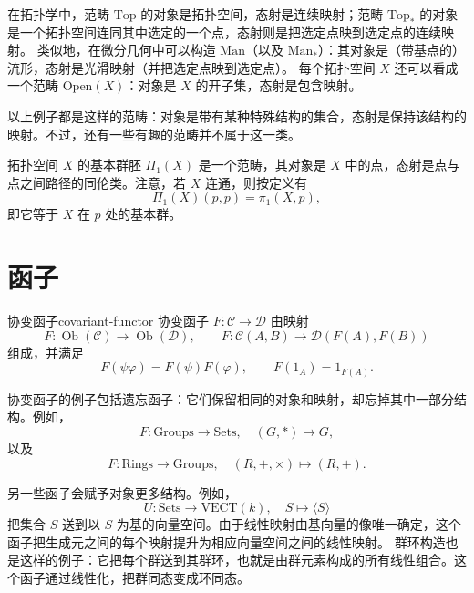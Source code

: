 \begin{example}[来自几何的例子]\label{ex:geometric-categories}
在拓扑学中，范畴 $\mathrm{Top}$ 的对象是拓扑空间，态射是连续映射；范畴 $\mathrm{Top}_*$ 的对象是一个拓扑空间连同其中选定的一个点，态射则是把选定点映到选定点的连续映射。
类似地，在微分几何中可以构造 $\mathrm{Man}$（以及 $\mathrm{Man}_*$）：其对象是（带基点的）流形，态射是光滑映射（并把选定点映到选定点）。
每个拓扑空间 $X$ 还可以看成一个范畴 $\mathrm{Open}(X)$：对象是 $X$ 的开子集，态射是包含映射。
\end{example}

以上例子都是这样的范畴：对象是带有某种特殊结构的集合，态射是保持该结构的映射。不过，还有一些有趣的范畴并不属于这一类。

\begin{example}[基本群胚]\label{ex:fundamental-groupoid}
拓扑空间 $X$ 的基本群胚 $\Pi_1(X)$ 是一个范畴，其对象是 $X$ 中的点，态射是点与点之间路径的同伦类。注意，若 $X$ 连通，则按定义有
\[
  \Pi_1(X)(p,p)=\pi_1(X,p),
\]
即它等于 $X$ 在 $p$ 处的基本群。
\end{example}

\section{函子}\label{sec:functors}
\begin{definition}{协变函子}{covariant-functor}
协变函子 $F\colon\mathcal C\to\mathcal D$ 由映射
\[
F\colon\operatorname{Ob}(\mathcal C)\to\operatorname{Ob}(\mathcal D),
\qquad
F\colon\mathcal C(A,B)\to\mathcal D(F(A),F(B))
\]
组成，并满足
\[
F(\psi\varphi)=F(\psi)F(\varphi),\qquad F(1_A)=1_{F(A)}.
\]
\end{definition}

\begin{example}[遗忘函子]\label{ex:forgetful-functors}
协变函子的例子包括遗忘函子：它们保留相同的对象和映射，却忘掉其中一部分结构。例如，
\[
  F\colon\mathrm{Groups}\to\mathrm{Sets},\quad (G,*)\longmapsto G,
\]
以及
\[
  F\colon\mathrm{Rings}\to\mathrm{Groups},\quad
  (R,+,\times)\longmapsto(R,+).
\]
\end{example}

\begin{example}[自由向量空间与群环]\label{ex:free-vector-space}
另一些函子会赋予对象更多结构。例如，
\[
  U\colon\mathrm{Sets}\to\mathrm{VECT}(k),\quad
  S\longmapsto\langle S\rangle
\]
把集合 $S$ 送到以 $S$ 为基的向量空间。由于线性映射由基向量的像唯一确定，这个函子把生成元之间的每个映射提升为相应向量空间之间的线性映射。
群环构造也是这样的例子：它把每个群送到其群环，也就是由群元素构成的所有线性组合。这个函子通过线性化，把群同态变成环同态。
\end{example}

